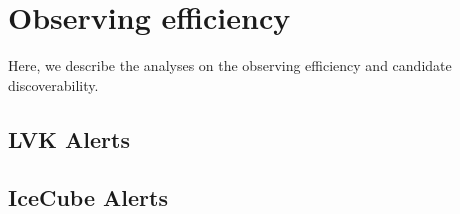 \section{Observing efficiency}\label{sec:efficiency}

Here, we describe the analyses on the observing efficiency and candidate discoverability.

\subsection{LVK Alerts}\label{subsec:Efficiency-LVK}

\subsection{IceCube Alerts}\label{subsec:Efficiency-IceCube}

\newpage